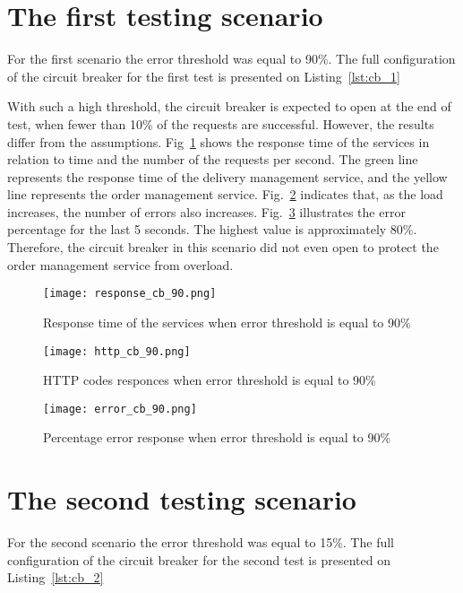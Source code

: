 \section{The first testing scenario}\label{sec:test_description_1}
For the first scenario the error threshold was equal to 90\%.
The full configuration of the circuit breaker for the first test is presented on Listing~\ref{lst:cb_1}



With such a high threshold, the circuit breaker is expected to open at the end of test, when fewer than 10\% of the requests are successful.
However, the results differ from the assumptions.
Fig~\ref{fig:response-cb-90} shows the response time of the services in relation to time and the number of the requests per second. The green line represents the response time of the delivery management service, and the yellow line represents the order management service.
Fig.~\ref{fig:http-cb-90} indicates that, as the load increases, the number of errors also increases.
Fig.~\ref{fig:error-cb-90} illustrates the error percentage for the last 5 seconds. The highest value is approximately 80\%.
Therefore, the circuit breaker in this scenario did not even open to protect the order management service from overload.

\begin{figure}[t]
    \centering
    \texttt{[image: response\_cb\_90.png]}
    \caption{Response time of the services when error threshold is equal to 90\%}
    \label{fig:response-cb-90}
\end{figure}
\begin{figure}[t]
    \centering
    \texttt{[image: http\_cb\_90.png]}
    \caption{HTTP codes responces when error threshold is equal to 90\%}
    \label{fig:http-cb-90}
\end{figure}
\begin{figure}[t]
    \centering
    \texttt{[image: error\_cb\_90.png]}
    \caption{Percentage error response when error threshold is equal to 90\%}
    \label{fig:error-cb-90}
\end{figure}

\section{The second testing scenario}\label{sec:test_description_2}
For the second scenario the error threshold was equal to 15\%.
The full configuration of the circuit breaker for the second test is presented on Listing~\ref{lst:cb_2}
\begin{minipage}{\textwidth}

\end{minipage}

